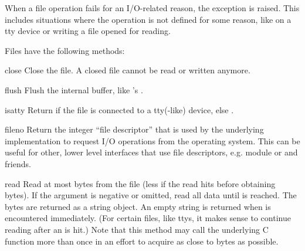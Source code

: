 When a file operation fails for an I/O-related reason, the exception
 is raised.  This includes situations where the
operation is not defined for some reason, like  on a tty
device or writing a file opened for reading.

Files have the following methods:


\begin{methoddesc}[file]{close}{}
  Close the file.  A closed file cannot be read or written anymore.
\end{methoddesc}

\begin{methoddesc}[file]{flush}{}
  Flush the internal buffer, like 's .
\end{methoddesc}

\begin{methoddesc}[file]{isatty}{}
  Return  if the file is connected to a tty(-like) device, else
  .
\end{methoddesc}

\begin{methoddesc}[file]{fileno}{}
Return the integer ``file descriptor'' that is used by the underlying
implementation to request I/O operations from the operating system.
This can be useful for other, lower level interfaces that use file
descriptors, e.g. module  or  and friends.
\end{methoddesc}

\begin{methoddesc}[file]{read}{}
  Read at most  bytes from the file (less if the read hits
  \EOF{} before obtaining  bytes).  If the 
  argument is negative or omitted, read all data until \EOF{} is
  reached.  The bytes are returned as a string object.  An empty
  string is returned when \EOF{} is encountered immediately.  (For
  certain files, like ttys, it makes sense to continue reading after
  an \EOF{} is hit.)  Note that this method may call the underlying
  C function  more than once in an effort to
  acquire as close to  bytes as possible.
\end{methoddesc}

